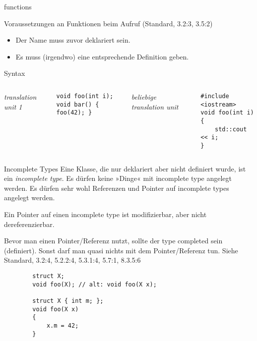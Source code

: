 \begin{frame}[fragile]{functions}
	\begin{block}{Voraussetzungen an Funktionen beim Aufruf (Standard, 3.2:3, 3.5:2)}
		\begin{itemize}
			\item Der Name muss zuvor deklariert sein.
			\item Es muss (irgendwo) eine entsprechende Definition geben.
		\end{itemize}
	\end{block}
	
	\begin{block}{Syntax}
		\begin{columns}[t]
			\emph{translation unit 1}
			\vspace{0.5em}
			\begin{lstlisting}
void foo(int i);
void bar() { foo(42); }
			\end{lstlisting}
			
			\emph{beliebige translation unit}
			\vspace{0.5em}
			\begin{lstlisting}
#include <iostream>
void foo(int i)
{
    std::cout << i;
}
			\end{lstlisting}
		\end{columns}
	\end{block}
\end{frame}


\begin{frame}[fragile]{Incomplete Types}
	Eine Klasse, die nur deklariert aber nicht definiert wurde, ist ein \emph{incomplete type}.
	Es dürfen keine »Dinge« mit incomplete type angelegt werden.
	Es dürfen sehr wohl Referenzen und Pointer auf incomplete types angelegt werden.
	
	Ein Pointer auf einen incomplete type ist modifizierbar, aber nicht dereferenzierbar.
	
	Bevor man einen Pointer/Referenz nutzt, sollte der type completed sein (definiert). Sonst darf man quasi nichts mit dem Pointer/Referenz tun. Siehe Standard, 3.2:4, 5.2.2:4, 5.3.1:4, 5.7:1, 8.3.5:6
	
	\begin{lstlisting}
		struct X;
		void foo(X); // alt: void foo(X x);
		
		struct X { int m; };
		void foo(X x)
		{
		    x.m = 42;
		}
	\end{lstlisting}
\end{frame}


